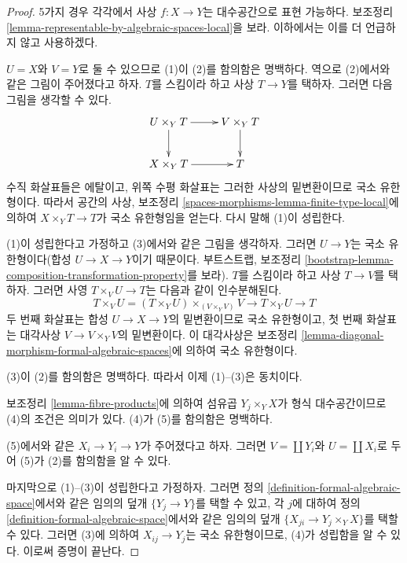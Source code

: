 \begin{proof}
5가지 경우 각각에서 사상 $f : X \to Y$는 대수공간으로 표현
가능하다. 보조정리
\ref{lemma-representable-by-algebraic-spaces-local}을 보라. %
이하에서는 이를 더 언급하지 않고 사용하겠다.

\medskip\noindent
$U = X$와 $V = Y$로 둘 수 있으므로 (1)이 (2)를 함의함은 명백하다.
역으로 (2)에서와 같은 그림이 주어졌다고 하자. $T$를 스킴이라 하고
사상 $T \to Y$를 택하자. 그러면 다음 그림을 생각할 수 있다.
$$
\xymatrix{
U \times_Y T \ar[d] \ar[r] & V \times_Y T \ar[d] \\
X \times_Y T \ar[r] & T
}
$$
수직 화살표들은 에탈이고, 위쪽 수평 화살표는 그러한 사상의
밑변환이므로 국소 유한형이다. %
따라서 공간의 사상, 보조정리
\ref{spaces-morphisms-lemma-finite-type-local}에 의하여
$X \times_Y T \to T$가 국소 유한형임을 얻는다. 다시 말해
(1)이 성립한다.

\medskip\noindent
(1)이 성립한다고 가정하고 (3)에서와 같은 그림을 생각하자. 그러면
$U \to Y$는 국소 유한형이다(합성 $U \to X \to Y$이기 때문이다.
부트스트랩, 보조정리
\ref{bootstrap-lemma-composition-transformation-property}를 보라).
$T$를 스킴이라 하고 사상 $T \to V$를 택하자. 그러면 사영
$T \times_V U \to T$는 다음과 같이 인수분해된다.
$$
T \times_V U = (T \times_Y U) \times_{(V \times_Y V)} V
\to T \times_Y U \to T
$$
두 번째 화살표는 합성 $U \to X \to Y$의 밑변환이므로 국소
유한형이고, 첫 번째 화살표는 대각사상
$V \to V \times_Y V$의 밑변환이다. 이 대각사상은 보조정리
\ref{lemma-diagonal-morphism-formal-algebraic-spaces}에 의하여 국소
유한형이다.

\medskip\noindent
(3)이 (2)를 함의함은 명백하다. 따라서 이제 (1)--(3)은 동치이다.

\medskip\noindent
보조정리 \ref{lemma-fibre-products}에 의하여 섬유곱
$Y_j \times_Y X$가 형식 대수공간이므로 (4)의 조건은 의미가 있다.
(4)가 (5)를 함의함은 명백하다.

\medskip\noindent
(5)에서와 같은 $X_i \to Y_i \to Y$가 주어졌다고 하자. 그러면
$V = \coprod Y_i$와 $U = \coprod X_i$로 두어 (5)가 (2)를
함의함을 알 수 있다.

\medskip\noindent
마지막으로 (1)--(3)이 성립한다고 가정하자. 그러면 정의
\ref{definition-formal-algebraic-space}에서와 같은 임의의 덮개
$\{Y_j \to Y\}$를 택할 수 있고, 각 $j$에 대하여 정의
\ref{definition-formal-algebraic-space}에서와 같은 임의의 덮개
$\{X_{ji} \to Y_j \times_Y X\}$를 택할 수 있다. 그러면 (3)에
의하여 $X_{ij} \to Y_j$는 국소 유한형이므로, (4)가 성립함을
알 수 있다. %
이로써 증명이 끝난다.
\end{proof}


